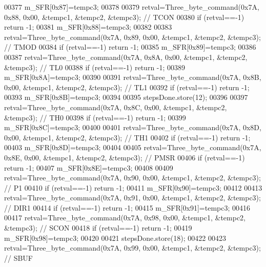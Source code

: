 \begin{DoxyCode}
{{00377     m\_SFR[0x87]=tempc3;
00378 
00379     retval=Three\_byte\_command(0x7A, 0x88, 0x00, &tempc1, &tempc2, &tempc3); \textcolor{comment}{// TCON}
00380     \textcolor{keywordflow}{if} (retval==-1) \textcolor{keywordflow}{return} -1;
00381     m\_SFR[0x88]=tempc3;
00382 
00383     retval=Three\_byte\_command(0x7A, 0x89, 0x00, &tempc1, &tempc2, &tempc3); \textcolor{comment}{// TMOD}
00384     \textcolor{keywordflow}{if} (retval==-1) \textcolor{keywordflow}{return} -1;
00385     m\_SFR[0x89]=tempc3;
00386 
00387     retval=Three\_byte\_command(0x7A, 0x8A, 0x00, &tempc1, &tempc2, &tempc3); \textcolor{comment}{// TL0}
00388     \textcolor{keywordflow}{if} (retval==-1) \textcolor{keywordflow}{return} -1;
00389     m\_SFR[0x8A]=tempc3;
00390 
00391     retval=Three\_byte\_command(0x7A, 0x8B, 0x00, &tempc1, &tempc2, &tempc3); \textcolor{comment}{// TL1}
00392     \textcolor{keywordflow}{if} (retval==-1) \textcolor{keywordflow}{return} -1;
00393     m\_SFR[0x8B]=tempc3;
00394 
00395     stepsDone.store(12);
00396 
00397     retval=Three\_byte\_command(0x7A, 0x8C, 0x00, &tempc1, &tempc2, &tempc3); \textcolor{comment}{// TH0}
00398     \textcolor{keywordflow}{if} (retval==-1) \textcolor{keywordflow}{return} -1;
00399     m\_SFR[0x8C]=tempc3;
00400 
00401     retval=Three\_byte\_command(0x7A, 0x8D, 0x00, &tempc1, &tempc2, &tempc3); \textcolor{comment}{// TH1}
00402     \textcolor{keywordflow}{if} (retval==-1) \textcolor{keywordflow}{return} -1;
00403     m\_SFR[0x8D]=tempc3;
00404 
00405     retval=Three\_byte\_command(0x7A, 0x8E, 0x00, &tempc1, &tempc2, &tempc3); \textcolor{comment}{// PMSR}
00406     \textcolor{keywordflow}{if} (retval==-1) \textcolor{keywordflow}{return} -1;
00407     m\_SFR[0x8E]=tempc3;
00408 
00409     retval=Three\_byte\_command(0x7A, 0x90, 0x00, &tempc1, &tempc2, &tempc3); \textcolor{comment}{// P1}
00410     \textcolor{keywordflow}{if} (retval==-1) \textcolor{keywordflow}{return} -1;
00411     m\_SFR[0x90]=tempc3;
00412 
00413     retval=Three\_byte\_command(0x7A, 0x91, 0x00, &tempc1, &tempc2, &tempc3); \textcolor{comment}{// DIR1}
00414     \textcolor{keywordflow}{if} (retval==-1) \textcolor{keywordflow}{return} -1;
00415     m\_SFR[0x91]=tempc3;
00416 
00417     retval=Three\_byte\_command(0x7A, 0x98, 0x00, &tempc1, &tempc2, &tempc3); \textcolor{comment}{// SCON}
00418     \textcolor{keywordflow}{if} (retval==-1) \textcolor{keywordflow}{return} -1;
00419     m\_SFR[0x98]=tempc3;
00420 
00421     stepsDone.store(18);
00422 
00423     retval=Three\_byte\_command(0x7A, 0x99, 0x00, &tempc1, &tempc2, &tempc3); \textcolor{comment}{// SBUF}
}}
\end{DoxyCode}
